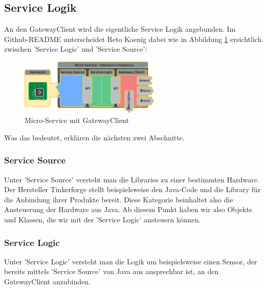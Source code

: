 \subsection{Service Logik}
An den GatewayClient wird die eigentliche Service Logik angebunden. Im Github-README unterscheidet Reto Koenig\cite{ch.quantasy.mqtt.gateway} dabei wie in Abbildung \ref{fig:microService} ersichtlich zwischen 'Service Logic' und 'Service Source':
\begin{figure}[H]
	\centering
	\includegraphics[width=0.6\textwidth]{img/gatewayclient-microservice.pdf}
	\caption{Micro-Service mit GatewayClient \cite{ch.quantasy.mqtt.gateway}}
	\label{fig:microService}
\end{figure}
Was das bedeutet, erklären die nächsten zwei Abschnitte.
\subsubsection{Service Source}
Unter 'Service Source' versteht man die Libraries zu einer bestimmten Hardware. Der Hersteller Tinkerforge\cite{tinkerforge-gmbh} stellt beispielsweise den Java-Code und die Library für die Anbindung ihrer Produkte bereit. Diese Kategorie beinhaltet also die Ansteuerung der Hardware aus Java. Ab diesem Punkt haben wir also Objekte und Klassen, die wir mit der 'Service Logic' ansteuern können.
\subsubsection{Service Logic}
Unter 'Service Logic' versteht man die Logik um beispielsweise einen Sensor, der bereits mittels 'Service Source' von Java aus ansprechbar ist, an den GatewayClient anzubinden.


